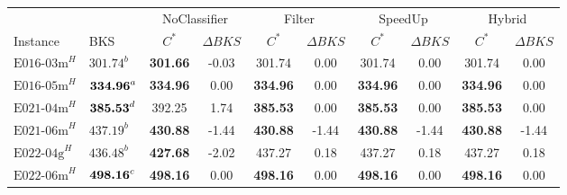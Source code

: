 \begin{table}[ht]
    \centering
    \scriptsize
    \renewcommand{\arraystretch}{1.02}
    \begin{tabular}{@{}llcccccccc@{}}
        \toprule
                            &                             & \multicolumn{2}{c}{NoClassifier} & \multicolumn{2}{c}{Filter} & \multicolumn{2}{c}{SpeedUp} & \multicolumn{2}{c}{Hybrid}                                                                    \\ \cline{3-4}\cline{5-6}\cline{7-8}\cline{9-10}
        Instance            & BKS                         & $C^*$                            & $\Delta BKS$               & $C^*$                       & $\Delta BKS$               & $C^*$            & $\Delta BKS$ & $C^*$           & $\Delta BKS$ \\
        \midrule
        $\text{E016-03m}^H$ & $\text{301.74}^b$           & \textbf{301.66}                  & -0.03                      & 301.74                      & 0.00                       & 301.74           & 0.00         & 301.74          & 0.00         \\
        $\text{E016-05m}^H$ & $\text{\textbf{334.96}}^a$  & \textbf{334.96}                  & 0.00                       & \textbf{334.96}             & 0.00                       & \textbf{334.96}  & 0.00         & \textbf{334.96} & 0.00         \\
        $\text{E021-04m}^H$ & $\text{\textbf{385.53}}^d$  & 392.25                           & 1.74                       & \textbf{385.53}             & 0.00                       & \textbf{385.53}  & 0.00         & \textbf{385.53} & 0.00         \\
        $\text{E021-06m}^H$ & $\text{437.19}^b$           & \textbf{430.88}                  & -1.44                      & \textbf{430.88}             & -1.44                      & \textbf{430.88}  & -1.44        & \textbf{430.88} & -1.44        \\
        $\text{E022-04g}^H$ & $\text{436.48}^b$           & \textbf{427.68}                  & -2.02                      & 437.27                      & 0.18                       & 437.27           & 0.18         & 437.27          & 0.18         \\
        $\text{E022-06m}^H$ & $\text{\textbf{498.16}}^c$  & \textbf{498.16}                  & 0.00                       & \textbf{498.16}             & 0.00                       & \textbf{498.16}  & 0.00         & \textbf{498.16} & 0.00         \\

\end{tabular}
\end{table}
